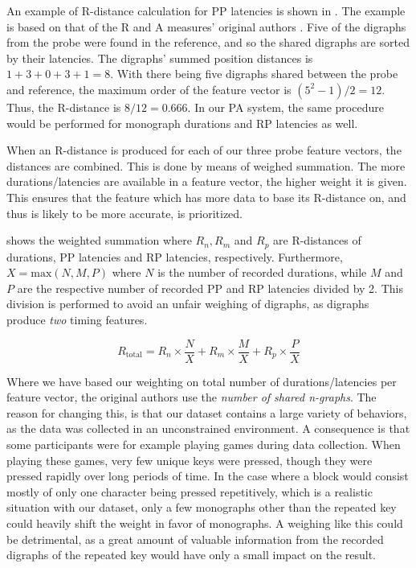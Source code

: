 An example of R-distance calculation for PP latencies is shown in . The example is based on that of the R and A measures' original authors \cite{gnp}.
Five of the digraphs from the probe were found in the reference, and so the shared digraphs are sorted by their latencies.
The digraphs' summed position distances is $1 + 3 + 0 + 3 + 1 = 8$.
With there being five digraphs shared between the probe and reference, the maximum order of the feature vector is $(5^2 - 1)/2 = 12$.
Thus, the R-distance is $8/12 = 0.666$.
In our PA system, the same procedure would be performed for monograph durations and RP latencies as well.

When an R-distance is produced for each of our three probe feature vectors, the distances are combined.
This is done by means of weighed summation.
The more durations/latencies are available in a feature vector, the higher weight it is given.
This ensures that the feature which has more data to base its R-distance on, and thus is likely to be more accurate, is prioritized.

 shows the weighted summation where $R_n, R_m$ and $R_p$ are R-distances of durations, PP latencies and RP latencies, respectively.
Furthermore, $X = \text{max}(N, M, P)$ where $N$ is the number of recorded durations, while $M$ and $P$ are the respective number of recorded PP and RP latencies divided by 2.
This division is performed to avoid an unfair weighing of digraphs, as digraphs produce \textit{two} timing features.

\begin{equation}
\label{eq:R-combination}
    R_{\text{total}} = R_n \times \frac{N}{X} + R_m \times \frac{M}{X} + R_p \times \frac{P}{X}
\end{equation}

Where we have based our weighting on total number of durations/latencies per feature vector, the original authors use the \textit{number of shared n-graphs}.
The reason for changing this, is that our dataset contains a large variety of behaviors, as the data was collected in an unconstrained environment.
A consequence is that some participants were for example playing games during data collection.
When playing these games, very few unique keys were pressed, though they were pressed rapidly over long periods of time.
In the case where a block would consist mostly of only one character being pressed repetitively, which is a realistic situation with our dataset, only a few monographs other than the repeated key could heavily shift the weight in favor of monographs.
A weighing like this could be detrimental, as a great amount of valuable information from the recorded digraphs of the repeated key would have only a small impact on the result.

